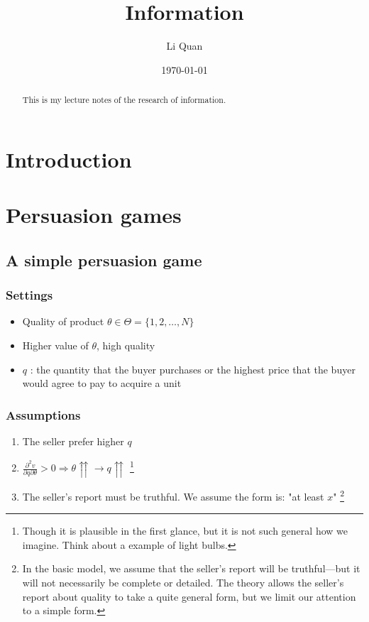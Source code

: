 \documentclass[12pt,letterpaper]{article}
\begin{document}
\title{\textbf{Information}\\{\small \textbf{}}}
\author{Li Quan}
\date{\today}
\maketitle
\begin{abstract}
This is my lecture notes of the research of information.
\end{abstract}


\section*{Introduction}

\section{Persuasion games}

\subsection{A simple persuasion game}
\subsubsection{Settings}
\begin{itemize}
	\item Quality of product  $ \theta \in \Theta = \{1,2,\dots,N\} $
	\item Higher value of $ \theta $, high quality
	
	\item $q$ : the quantity that the buyer
	purchases or the highest price that the buyer would agree to pay to acquire a unit
\end{itemize}

\subsubsection{Assumptions}

\begin{enumerate}
	\item The seller prefer higher $q$
	\item $\frac{\partial^2 v}{\partial q \partial \theta} > 0 \Rightarrow \theta \upuparrows \rightarrow q \upuparrows $ \footnote{Though it is plausible in the first glance, but it is not such general how we imagine. Think about a example of light bulbs.}
	\item The seller's report must be truthful. We assume the form is: "at least $ x $" \footnote{In the basic model, we assume that the seller’s report will be truthful—but it will not necessarily be complete or detailed. The theory allows the seller’s report about quality to take a quite general form, but we limit our attention to a simple form.}
\end{enumerate}
\end{document}
